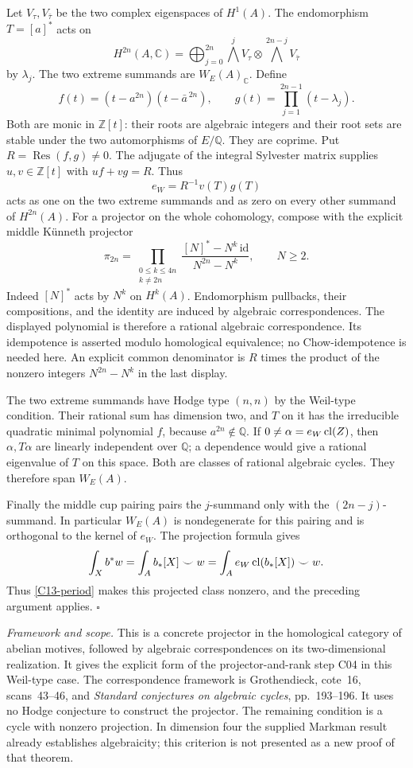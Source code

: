 \documentclass[11pt]{article}
\newcommand{\Q}{\mathbb Q}\newcommand{\C}{\mathbb C}\newcommand{\Z}{\mathbb Z}\newcommand{\R}{\mathbb R}\newcommand{\A}{\mathbb A}\newcommand{\OO}{\mathcal O}
\newcommand{\framework}[1]{\par\smallskip\noindent\textit{Framework and scope.} #1\par}
\theoremstyle{definition}\newtheorem{definition}[theorem]{Definition}\newtheorem{remark}[theorem]{Remark}
\begin{document}
Let $V_\tau,V_{\bar\tau}$ be the two complex eigenspaces of $H^1(A)$.
The endomorphism $T=[a]^*$ acts on
\[
 H^{2n}(A,\C)=\bigoplus_{j=0}^{2n}
       \bigwedge^jV_\tau\otimes\bigwedge^{2n-j}V_{\bar\tau}
\]
by $\lambda_j$. The two extreme summands are
$W_E(A)_\C$. Define
\[
 f(t)=(t-a^{2n})(t-\bar a^{\,2n}),\qquad
 g(t)=\prod_{j=1}^{2n-1}(t-\lambda_j).
\]
Both are monic in $\Z[t]$: their roots are algebraic integers and
their root sets are stable under the two automorphisms of $E/\Q$.
They are coprime. Put $R=\operatorname{Res}(f,g)\ne0$.
The adjugate of the integral Sylvester matrix supplies
$u,v\in\Z[t]$ with $uf+vg=R$. Thus
\[
 e_W=R^{-1}v(T)g(T)
\]
acts as one on the two extreme summands and as zero on every other
summand of $H^{2n}(A)$. For a projector on the whole cohomology, compose
with the explicit middle K\"unneth projector
\[
 \pi_{2n}=
 \prod_{\substack{0\le k\le4n\\k\ne2n}}
   \frac{[N]^*-N^k\,\mathrm{id}}{N^{2n}-N^k},\qquad N\ge2.
\]
Indeed $[N]^*$ acts by $N^k$ on $H^k(A)$. Endomorphism pullbacks,
their compositions, and the identity are induced by algebraic
correspondences. The displayed polynomial is therefore a rational
algebraic correspondence. Its idempotence is asserted modulo
homological equivalence; no Chow-idempotence is needed here.
An explicit common denominator is $R$ times the product of the
nonzero integers $N^{2n}-N^k$ in the last display.

The two extreme summands have Hodge type $(n,n)$ by the Weil-type
condition. Their rational sum has dimension two, and $T$ on it has
the irreducible quadratic minimal polynomial $f$, because
$a^{2n}\notin\Q$. If $0\ne\alpha=e_W\operatorname{cl}(Z)$, then
$\alpha,T\alpha$ are linearly independent over $\Q$; a dependence
would give a rational eigenvalue of $T$ on this space. Both are
classes of rational algebraic cycles. They therefore span $W_E(A)$.

Finally the middle cup pairing pairs the $j$-summand only with the
$(2n-j)$-summand. In particular $W_E(A)$ is nondegenerate for this
pairing and is orthogonal to the kernel of $e_W$. The projection
formula gives
\[
 \int_X b^*w=\int_A b_*[X]\smile w
           =\int_A e_W\operatorname{cl}(b_*[X])\smile w.
\]
Thus \eqref{C13-period} makes this projected class nonzero, and the
preceding argument applies. $\square$

\framework{This is a concrete projector in the homological category
of abelian motives, followed by algebraic correspondences on its
two-dimensional realization. It gives the explicit form of the
projector-and-rank step C04 in this Weil-type case. The correspondence
framework is Grothendieck, cote~16, scans~43--46, and
\emph{Standard conjectures on algebraic cycles}, pp.~193--196.
It uses no Hodge conjecture to construct the projector. The remaining
condition is a cycle with nonzero projection. In dimension four the
supplied Markman result already establishes algebraicity; this
criterion is not presented as a new proof of that theorem.}
\end{document}

